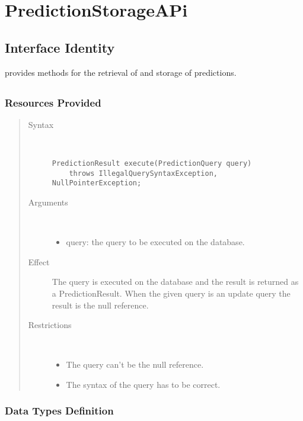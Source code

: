 \section{PredictionStorageAPi}
\label{api:prediction-storage-api}

\subsection{Interface Identity}

\npar {} provides methods for the retrieval of and storage of
predictions.

\subsection{}

\subsubsection{Resources Provided}

\begin{quote}
	\begin{description}
		\item[Syntax] \
		\begin{verbatim}
PredictionResult execute(PredictionQuery query)
    throws IllegalQuerySyntaxException, NullPointerException;
		\end{verbatim}
		\item[Arguments] \
		\begin{itemize}
		  \item query: the query to be executed on the database. 
		\end{itemize}
		\item[Effect] The query is executed on the database and the result is returned
		as a PredictionResult. When the given query is an update query the result is
		the null reference.
		\item[Restrictions] \
		\begin{itemize}
		  \item The query can't be the null reference.
		  \item The syntax of the query has to be correct.
		\end{itemize}
	\end{description} 
\end{quote}

\subsubsection{Data Types Definition}

